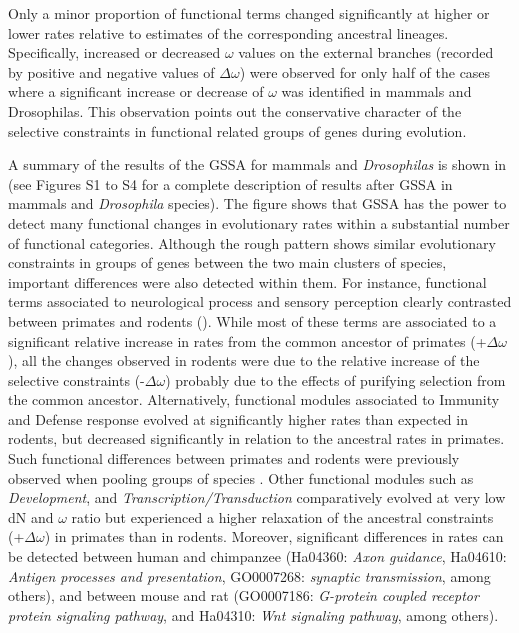 Only a minor proportion of functional terms changed significantly at higher or lower rates relative to estimates of the corresponding ancestral lineages. Specifically, increased or decreased $\omega$ values on the external branches (recorded by positive and negative values of $\Delta\omega$) were observed for only half of the cases where a significant increase or decrease of $\omega$ was identified in mammals and Drosophilas. This observation points out the conservative character of the selective constraints in functional related groups of genes during evolution.

A summary of the results of the GSSA for mammals and \textit{Drosophilas} is shown in  (see Figures S1 to S4 for a complete description of results after GSSA in mammals and \textit{Drosophila} species). The figure shows that GSSA has the power to detect many functional changes in evolutionary rates within a substantial number of functional categories. Although the rough pattern shows similar evolutionary constraints in groups of genes between the two main clusters of species, important differences were also detected within them. For instance, functional terms associated to neurological process and sensory perception clearly contrasted between primates and rodents (). While most of these terms are associated to a significant relative increase in rates from the common ancestor of primates (+$\Delta\omega$), all the changes observed in rodents were due to the relative increase of the selective constraints (-$\Delta\omega$) probably due to the effects of purifying selection from the common ancestor. Alternatively, functional modules associated to Immunity and Defense response evolved at significantly higher rates than expected in rodents, but decreased significantly in relation to the ancestral rates in primates. Such functional differences between primates and rodents were previously observed when pooling groups of species \cite{Kosiol2008a}. Other functional modules such as \textit{Development}, and \textit{Transcription/Transduction} comparatively evolved at very low dN and $\omega$ ratio but experienced a higher relaxation of the ancestral constraints (+$\Delta\omega$) in primates than in rodents. Moreover, significant differences in rates can be detected between human and chimpanzee (Ha04360: \textit{Axon guidance}, Ha04610: \textit{Antigen processes and presentation}, GO0007268: \textit{synaptic transmission}, among others), and between mouse and rat (GO0007186: \textit{G-protein coupled receptor protein signaling pathway}, and Ha04310: \textit{Wnt signaling pathway}, among others).


